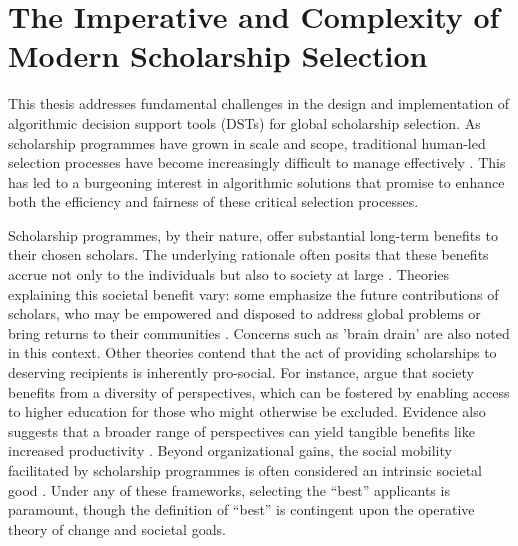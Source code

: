\minitoc

\section{The Imperative and Complexity of Modern Scholarship Selection}\label{sec:context_problem_scope_value}

This thesis addresses fundamental challenges in the design and implementation of algorithmic decision support tools (DSTs) for global scholarship selection. As scholarship programmes have grown in scale and scope, traditional human-led selection processes have become increasingly difficult to manage effectively \cite{Latzer_Hollnbuchner_Just_Saurwein_2014}. This has led to a burgeoning interest in algorithmic solutions that promise to enhance both the efficiency and fairness of these critical selection processes.

Scholarship programmes, by their nature, offer substantial long-term benefits to their chosen scholars. The underlying rationale often posits that these benefits accrue not only to the individuals but also to society at large \cite{DilraboJonbekova_Ruby_2023,Dassin_Marsh_Mawer_2018}. Theories explaining this societal benefit vary: some emphasize the future contributions of scholars, who may be empowered and disposed to address global problems or bring returns to their communities \cite{Dassin_Marsh_Mawer_2018}. Concerns such as 'brain drain' are also noted in this context. Other theories contend that the act of providing scholarships to deserving recipients is inherently pro-social. For instance, \textcite{minkin2023diversity} argue that society benefits from a diversity of perspectives, which can be fostered by enabling access to higher education for those who might otherwise be excluded. Evidence also suggests that a broader range of perspectives can yield tangible benefits like increased productivity \cite{autor2008does,noray2023systemic}. Beyond organizational gains, the social mobility facilitated by scholarship programmes is often considered an intrinsic societal good \cite{Dassin_Marsh_Mawer_2018}. Under any of these frameworks, selecting the ``best'' applicants is paramount, though the definition of ``best'' is contingent upon the operative theory of change and societal goals.

